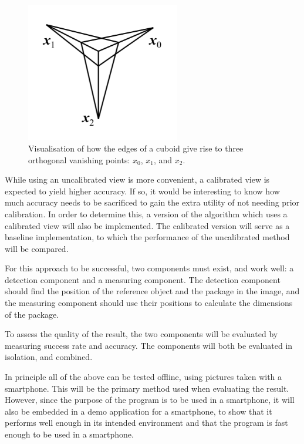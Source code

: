 \begin{figure}
\begin{center}
\includegraphics[width=0.6\textwidth]{figures/vanishing_points.png}
\end{center}
\caption{Visualisation of how the edges of a cuboid give rise to three orthogonal vanishing points: $x_0$, $x_1$, and $x_2$.} %
\label{fig:vanishing_points}
\end{figure}

While using an uncalibrated view is more convenient, a calibrated view is expected to yield higher accuracy.
If so, it would be interesting to know how much accuracy needs to be sacrificed to gain the extra utility of not needing prior calibration.
In order to determine this, a version of the algorithm which uses a calibrated view will also be implemented.
The calibrated version will serve as a baseline implementation, to which the performance of the uncalibrated method will be compared.

For this approach to be successful, two components must exist, and work well: a detection component and a measuring component.
The detection component should find the position of the reference object and the package in the image, and the measuring component should use their positions to calculate the dimensions of the package.

To assess the quality of the result, the two components will be evaluated by measuring success rate and accuracy.
The components will both be evaluated in isolation, and combined.

In principle all of the above can be tested offline, using pictures taken with a smartphone.
This will be the primary method used when evaluating the result.
However, since the purpose of the program is to be used in a smartphone, it will also be embedded in a demo application for a smartphone, to show that it performs well enough in its intended environment and that the program is fast enough to be used in a smartphone.

